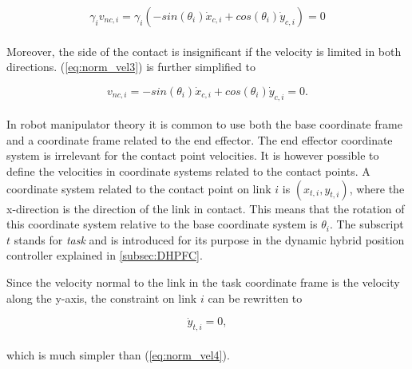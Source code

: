 \begin{equation}\label{eq:norm_vel3}
    \gamma_i v_{nc,i} = \gamma_i(-sin(\theta_i) \dot{x}_{c,i} + cos(\theta_i) \dot{y}_{c,i}) = 0
\end{equation}
\\
Moreover, the side of the contact is insignificant if the velocity is limited in both directions. (\ref{eq:norm_vel3}) is further simplified to

\begin{equation}\label{eq:norm_vel4}
    v_{nc,i} = -sin(\theta_i) \dot{x}_{c,i} + cos(\theta_i) \dot{y}_{c,i} = 0.
\end{equation}
\\
In robot manipulator theory it is common to use both the base coordinate frame and a coordinate frame related to the end effector. The end effector coordinate system is irrelevant for the contact point velocities. It is however possible to define the velocities in coordinate systems related to the contact points. A coordinate system related to the contact point on link $i$ is $(x_{t,i}, y_{t,i})$, where the x-direction is the direction of the link in contact. This means that the rotation of this coordinate system relative to the base coordinate system is $\theta_i$. The subscript $t$ stands for \textit{task} and is introduced for its purpose in the dynamic hybrid position controller explained in \ref{subsec:DHPFC}.

Since the velocity normal to the link in the task coordinate frame is the velocity along the y-axis, the constraint on link $i$ can be rewritten to

\begin{equation}\label{eq:norm_vel5}
    \dot{y}_{t,i} = 0,
\end{equation}
\\
which is much simpler than (\ref{eq:norm_vel4}).